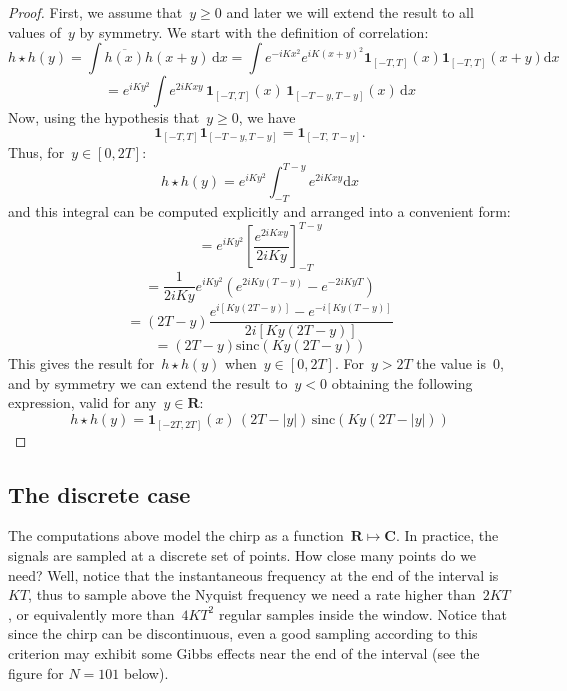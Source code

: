 \documentclass[a4paper]{article}           %
\newcommand{\1}{\mathbf{1}}
\newcommand{\R}{\mathbf{R}}
\newcommand{\C}{\mathbf{C}}
\newcommand{\ud}{\mathrm{d}}
\newcommand{\abs}[1]{\left|#1\right|}
\newcommand{\paren}[1]{\left(#1\right)}
\begin{document}
\begin{proof}
	First, we assume that~$y\ge0$ and later we will extend the result to all
	values of~$y$ by symmetry.  We start with the definition of correlation:
	\[
		h\star h (y)
		=
		\int
		\overline{h(x)}h(x+y)\,\ud x
		=
		\int
		e^{-iKx^2}
		e^{iK\paren{x+y}^2}
		\1_{[-T,T]} (x)
		\1_{[-T,T]} (x+y)
		\ud x
	\]
	\[
		=
		e^{iKy^2}
		\int
		e^{2iKxy}
		\,
		\1_{[-T,T]} (x)
		\,
		\1_{[-T-y,T-y]} (x)
		\,
		\ud x
	\]
	Now, using the hypothesis that~$y\ge0$, we have
	\[
		\1_{[-T,T]} \1_{[-T-y,T-y]}
		=
		\1_{[-T,\ T-y]}.
	\]
	Thus, for~$y\in[0,2T]$:
	\[
		h\star h (y)
		=
		e^{iKy^2}
		\int_{-T}^{T-y}
		e^{2iKxy}
		\ud x
	\]
	and this integral can be computed explicitly and arranged into a convenient
	form:
	\[
		=
		e^{iKy^2}
		\left[
			\frac{\displaystyle e^{2iKxy}}{2iKy}
		\right]_{-T}^{T-y}
	\]
	\[
		=
		\frac{1}{2iKy}
		e^{iKy^2}
		\paren{
			e^{2iKy(T-y)}
			-
			e^{-2iKyT}
		}
	\]
	\[
		=
		\paren{2T-y}
		\frac{
			e^{i\left[Ky\paren{2T-y}\right]}-e^{-i\left[Ky\paren{T-y}\right]}
			}{
				2i\left[Ky\paren{2T-y}\right]
		}
	\]
	\[
		=
		\paren{2T-y}\mathrm{sinc}\paren{Ky\paren{2T-y}}
	\]
	This gives the result for~$h\star h(y)$ when~$y\in[0,2T]$.  For~$y>2T$ the
	value is~$0$, and by symmetry we can extend the result to~$y<0$ obtaining
	the following expression, valid for any~$y\in\R$:
	\[
		h\star h(y)=\1_{[-2T,2T]}(x)\,\paren{2T-\abs{y}}
		\,
		\mathrm{sinc}\paren{ Ky\paren{2T-\abs{y}} }
	\]
\end{proof}

\subsection{The discrete case}

The computations above model the chirp as a function~$\R\mapsto\C$.  In
practice, the signals are sampled at a discrete set of points.  How close
many points do we need?  Well, notice that the instantaneous frequency at the
end of the interval is~$KT$, thus to sample above the Nyquist frequency we
need a rate higher than~$2KT$, or equivalently more than~$4KT^2$ regular
samples inside the window.  Notice that since the chirp can be discontinuous,
even a good sampling according to this criterion may exhibit some Gibbs
effects near the end of the interval (see the figure for $N=101$ below).
\end{document}
